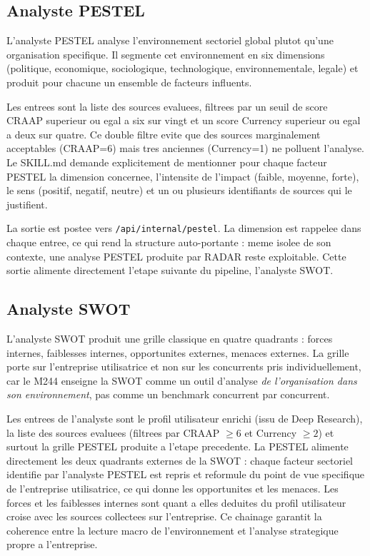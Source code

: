 \documentclass[12pt,a4paper,openany]{report}
\begin{document}
\subsection{Analyste PESTEL}
\label{sec:skill-pestel}

L'analyste PESTEL analyse l'environnement sectoriel global plutot qu'une organisation specifique. Il segmente cet environnement en six dimensions (politique, economique, sociologique, technologique, environnementale, legale) et produit pour chacune un ensemble de facteurs influents.

Les entrees sont la liste des sources evaluees, filtrees par un seuil de score CRAAP superieur ou egal a six sur vingt et un score Currency superieur ou egal a deux sur quatre. Ce double filtre evite que des sources marginalement acceptables (CRAAP=6) mais tres anciennes (Currency=1) ne polluent l'analyse. Le SKILL.md demande explicitement de mentionner pour chaque facteur PESTEL la dimension concernee, l'intensite de l'impact (faible, moyenne, forte), le sens (positif, negatif, neutre) et un ou plusieurs identifiants de sources qui le justifient.

La sortie est postee vers \texttt{/api/internal/pestel}. La dimension est rappelee dans chaque entree, ce qui rend la structure auto-portante : meme isolee de son contexte, une analyse PESTEL produite par RADAR reste exploitable. Cette sortie alimente directement l'etape suivante du pipeline, l'analyste SWOT.

\subsection{Analyste SWOT}
\label{sec:skill-swot}

L'analyste SWOT produit une grille classique en quatre quadrants : forces internes, faiblesses internes, opportunites externes, menaces externes. La grille porte sur l'entreprise utilisatrice et non sur les concurrents pris individuellement, car le M244 enseigne la SWOT comme un outil d'analyse \emph{de l'organisation dans son environnement}, pas comme un benchmark concurrent par concurrent.

Les entrees de l'analyste sont le profil utilisateur enrichi (issu de Deep Research), la liste des sources evaluees (filtrees par CRAAP $\geq 6$ et Currency $\geq 2$) et surtout la grille PESTEL produite a l'etape precedente. La PESTEL alimente directement les deux quadrants externes de la SWOT : chaque facteur sectoriel identifie par l'analyste PESTEL est repris et reformule du point de vue specifique de l'entreprise utilisatrice, ce qui donne les opportunites et les menaces. Les forces et les faiblesses internes sont quant a elles deduites du profil utilisateur croise avec les sources collectees sur l'entreprise. Ce chainage garantit la coherence entre la lecture macro de l'environnement et l'analyse strategique propre a l'entreprise.
\end{document}

